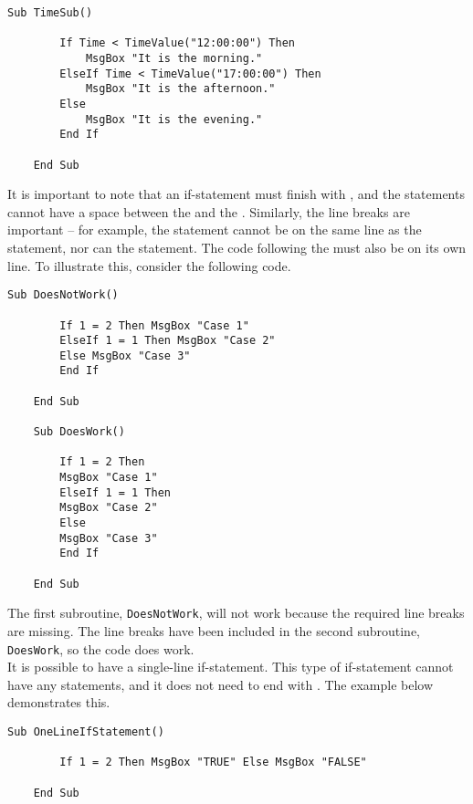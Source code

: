 \documentclass[11pt]{article}%
\begin{document}
\begin{lstlisting}[style=A]
    Sub TimeSub()

        If Time < TimeValue("12:00:00") Then
            MsgBox "It is the morning."
        ElseIf Time < TimeValue("17:00:00") Then
            MsgBox "It is the afternoon."
        Else
            MsgBox "It is the evening."
        End If

    End Sub
\end{lstlisting}

It is important to note that an if-statement must finish with , and the  statements cannot have a space between the  and the . Similarly, the line breaks are important -- for example, the  statement cannot be on the same line as the  statement, nor can the  statement. The code following the  must also be on its own line. To illustrate this, consider the following code.\\

\begin{lstlisting}[style=A]
    Sub DoesNotWork()

        If 1 = 2 Then MsgBox "Case 1"
        ElseIf 1 = 1 Then MsgBox "Case 2"
        Else MsgBox "Case 3"
        End If

    End Sub

    Sub DoesWork()

        If 1 = 2 Then
        MsgBox "Case 1"
        ElseIf 1 = 1 Then
        MsgBox "Case 2"
        Else
        MsgBox "Case 3"
        End If

    End Sub
\end{lstlisting}

The first subroutine, \texttt{DoesNotWork}, will not work because the required line breaks are missing. The line breaks have been included in the second subroutine, \texttt{DoesWork}, so the code does work.\\

It is possible to have a single-line if-statement. This type of if-statement cannot have any  statements, and it does not need to end with . The example below demonstrates this.\\

\begin{lstlisting}[style=A]
    Sub OneLineIfStatement()

        If 1 = 2 Then MsgBox "TRUE" Else MsgBox "FALSE"

    End Sub
\end{lstlisting}
\end{document}
